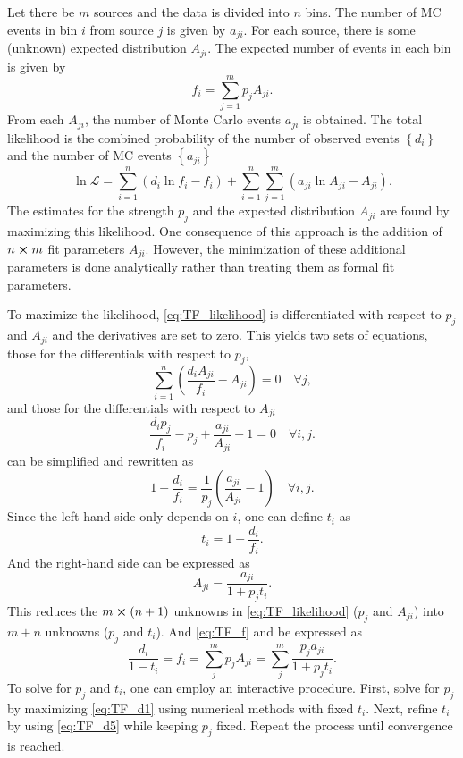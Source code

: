 \documentclass[../main.tex]{subfiles}
\begin{document}
Let there be $m$ sources and the data is divided into $n$ bins.
The number of MC events in bin $i$ from source $j$ is given by $a_{ji}$.
For each source, there is some (unknown) expected distribution $A_{ji}$.
The expected number of events in each bin is given by
\begin{equation}
	f_i = \sum^m_{j=1} p_j A_{ji}.
	\label{eq:TF_f}
\end{equation}
From each $A_{ji}$, the number of Monte Carlo events $a_{ji}$ is obtained.
The total likelihood is the combined probability of the number of observed events $\left\{d_i\right\}$
and the number of MC events $\left\{a_{ji}\right\}$
\begin{equation}
	\ln \mathcal{L} = \sum^n_{i=1} \left(d_i \ln f_i -f_i\right) + \sum^n_{i=1} \sum^m_{j=1} \left(a_{ji} \ln A_{ji} - A_{ji}\right).
	\label{eq:TF_likelihood}
\end{equation}
The estimates for the strength $p_j$ and the expected distribution $A_{ji}$ are
found by maximizing this likelihood. One consequence of this approach is the addition of
$n \cross m$ fit parameters $A_{ji}$. However, the  minimization of these additional
parameters is done analytically rather than treating them as formal fit parameters.

To maximize the likelihood, \cref{eq:TF_likelihood} is differentiated with respect to $p_j$
and $A_{ji}$ and the derivatives are set to zero.
This yields two sets of equations, those for the differentials with respect to $p_j$,
\begin{equation}
	\sum^n_{i=1} \left(\frac{d_i A_{ji}}{f_i} -A_{ji}\right)=0\quad \forall j,
	\label{eq:TF_d1}
\end{equation}
and those for the differentials with respect to $A_{ji}$
\begin{equation}
	\frac{d_i p_j}{f_i} - p_j + \frac{a_{ji}}{A_{ji}}-1=0\quad \forall 	i,j.
	\label{eq:TF_d2}
\end{equation}
 can be simplified and rewritten as
\begin{equation}
	1-\frac{d_i}{f_i} = \frac{1}{p_j}\left(\frac{a_{ji}}{A_{ji}}-1\right)\quad \forall i,j.
	\label{eq:TF_d3}
\end{equation}
Since the left-hand side only depends on $i$, one can define $t_i$ as
\begin{equation}
	t_i= 1-\frac{d_i}{f_i}.
	\label{eq:TF_d4}
\end{equation}
And the right-hand side can be expressed as
\begin{equation}
	A_{ji}=\frac{a_{ji}}{1+p_j t_i}.
\end{equation}
This reduces the $m\cross \left(n+1\right)$ unknowns in \cref{eq:TF_likelihood} ($p_j$ and $A_{ji}$)
into $m+n$ unknowns ($p_j$ and $t_i$).
And \cref{eq:TF_f} and be expressed as
\begin{equation}
	\frac{d_i}{1-t_i}=f_i=\sum_j^m p_jA_{ji}=\sum_j^m \frac{p_j a_{ji}}{1+p_jt_i}.
	\label{eq:TF_d5}
\end{equation}
To solve for $p_j$ and $t_i$, one can employ an interactive procedure. First, solve for $p_j$ by maximizing
\cref{eq:TF_d1} using numerical methods with fixed $t_i$. Next, refine $t_i$ by using \cref{eq:TF_d5} while keeping
$p_j$ fixed. Repeat the process until convergence is reached.
\end{document}
